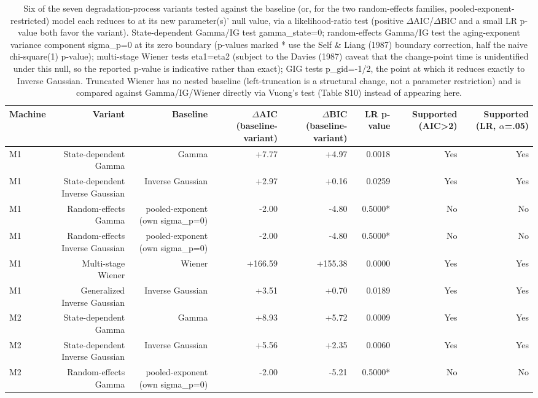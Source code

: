 \begin{table}[t]
\centering
\caption{Six of the seven degradation-process variants tested against the baseline (or, for the two random-effects families, pooled-exponent-restricted) model each reduces to at its new parameter(s)' null value, via a likelihood-ratio test (positive $\Delta$AIC/$\Delta$BIC and a small LR p-value both favor the variant). State-dependent Gamma/IG test gamma\_state=0; random-effects Gamma/IG test the aging-exponent variance component sigma\_p=0 at its zero boundary (p-values marked * use the Self \& Liang (1987) boundary correction, half the naive chi-square(1) p-value); multi-stage Wiener tests eta1=eta2 (subject to the Davies (1987) caveat that the change-point time is unidentified under this null, so the reported p-value is indicative rather than exact); GIG tests p\_gid=-1/2, the point at which it reduces exactly to Inverse Gaussian. Truncated Wiener has no nested baseline (left-truncation is a structural change, not a parameter restriction) and is compared against Gamma/IG/Wiener directly via Vuong's test (Table S10) instead of appearing here.}
\label{tab:variant-vs-baseline}
\begin{tabular}{lrrrrrrr}
\toprule
Machine & Variant & Baseline & $\Delta$AIC (baseline-variant) & $\Delta$BIC (baseline-variant) & LR p-value & Supported (AIC>2) & Supported (LR, $\alpha$=.05) \\
\midrule
M1 & State-dependent Gamma & Gamma & +7.77 & +4.97 & 0.0018 & Yes & Yes \\
M1 & State-dependent Inverse Gaussian & Inverse Gaussian & +2.97 & +0.16 & 0.0259 & Yes & Yes \\
M1 & Random-effects Gamma & pooled-exponent (own sigma\_p=0) & -2.00 & -4.80 & 0.5000* & No & No \\
M1 & Random-effects Inverse Gaussian & pooled-exponent (own sigma\_p=0) & -2.00 & -4.80 & 0.5000* & No & No \\
M1 & Multi-stage Wiener & Wiener & +166.59 & +155.38 & 0.0000 & Yes & Yes \\
M1 & Generalized Inverse Gaussian & Inverse Gaussian & +3.51 & +0.70 & 0.0189 & Yes & Yes \\
M2 & State-dependent Gamma & Gamma & +8.93 & +5.72 & 0.0009 & Yes & Yes \\
M2 & State-dependent Inverse Gaussian & Inverse Gaussian & +5.56 & +2.35 & 0.0060 & Yes & Yes \\
M2 & Random-effects Gamma & pooled-exponent (own sigma\_p=0) & -2.00 & -5.21 & 0.5000* & No & No \\

\end{tabular}
\end{table}

